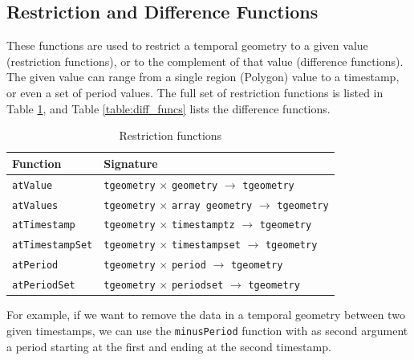 \subsection{Restriction and Difference Functions}
\label{section:restriction_and_difference}

These functions are used to restrict a temporal geometry to a given value (restriction functions), or to the complement of that value (difference functions). The given value can range from a single region (Polygon) value to a timestamp, or even a set of period values. The full set of restriction functions is listed in Table \ref{table:restriction_funcs}, and Table \ref{table:diff_funcs} lists the difference functions.

\begin{table}[h!]
    \centering
    \begin{tabularx}{\textwidth}{|l|X|}
    \hline
    \textbf{Function}   & \textbf{Signature} \\ 
    \hline
    \lstinline+atValue+             & \lstinline+tgeometry+ $\times$ \lstinline+geometry+ $\rightarrow$ \lstinline+tgeometry+\\
    \hline
    \lstinline+atValues+            & \lstinline+tgeometry+ $\times$ \lstinline+array geometry+ $\rightarrow$ \lstinline+tgeometry+\\
    \hline
    \lstinline+atTimestamp+         & \lstinline+tgeometry+ $\times$ \lstinline+timestamptz+ $\rightarrow$ \lstinline+tgeometry+ \\
    \hline
    \lstinline+atTimestampSet+      & \lstinline+tgeometry+ $\times$ \lstinline+timestampset+ $\rightarrow$ \lstinline+tgeometry+ \\
    \hline
    \lstinline+atPeriod+            & \lstinline+tgeometry+ $\times$ \lstinline+period+ $\rightarrow$ \lstinline+tgeometry+ \\
    \hline
    \lstinline+atPeriodSet+         & \lstinline+tgeometry+ $\times$ \lstinline+periodset+ $\rightarrow$ \lstinline+tgeometry+ \\
    \hline
    \end{tabularx}
    \caption{Restriction functions}
    \label{table:restriction_funcs}
\end{table}

For example, if we want to remove the data in a temporal geometry between two given timestamps, we can use the \lstinline{minusPeriod} function with as second argument a period starting at the first and ending at the second timestamp.

